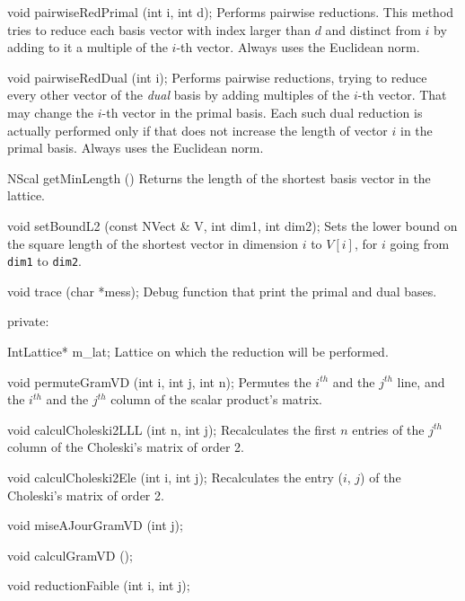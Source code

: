 {{   void pairwiseRedPrimal (int i, int d);
\endcode
\tabb
Performs pairwise reductions.
  This method tries to reduce each basis vector with
  index larger than $d$ and distinct from $i$ by adding to it a
  multiple of the $i$-th vector.
  Always uses the Euclidean norm.
\endtabb
\code

   void pairwiseRedDual (int i);
\endcode
\tabb
Performs pairwise reductions, trying to reduce every other vector of
  the {\em dual\/} basis by adding multiples of the $i$-th vector.
  That may change the $i$-th vector in the primal basis.
  Each such dual reduction is actually performed only if that does not
  increase the length of vector $i$ in the primal basis.
  Always uses the Euclidean norm.
\endtabb
\code

   NScal getMinLength ()  \endhide
\endcode
\tabb
Returns the length of the shortest basis vector in the lattice.
\endtabb
\code

   void setBoundL2 (const NVect & V, int dim1, int dim2);
\endcode
\tabb
  Sets the lower bound on the square length of the shortest vector in
  dimension $i$ to $V[i]$,  for $i$ going from \texttt{dim1} to \texttt{dim2}.
\endtabb
\code

   void trace (char *mess);
\endcode
\tabb
Debug function that print the primal and dual bases.
\endtabb
\ifdetailed
\code


private:

   IntLattice* m_lat;
\endcode
\tabb
Lattice on which the reduction will be performed.
\endtabb
\code

   void permuteGramVD (int i, int j, int n);
\endcode
\tabb
Permutes the $i^{th}$ and the $j^{th}$ line, and the $i^{th}$ and the $j^{th}$ column
of the scalar product's matrix.
\endtabb
\code

   void calculCholeski2LLL (int n, int j);
\endcode
\tabb
Recalculates the first $n$ entries of the $j^{th}$ column of the Choleski's matrix
of order 2.
\endtabb
\code

   void calculCholeski2Ele (int i, int j);
\endcode
\tabb
Recalculates the entry ($i$, $j$) of the Choleski's matrix of order 2.
\endtabb
\code

   void miseAJourGramVD (int j);
\endcode
\tabb
\endtabb
\code

   void calculGramVD ();
\endcode
\tabb
\endtabb
\code

   void reductionFaible (int i, int j);
\endcode
\tabb
\endtabb
\code

}}
